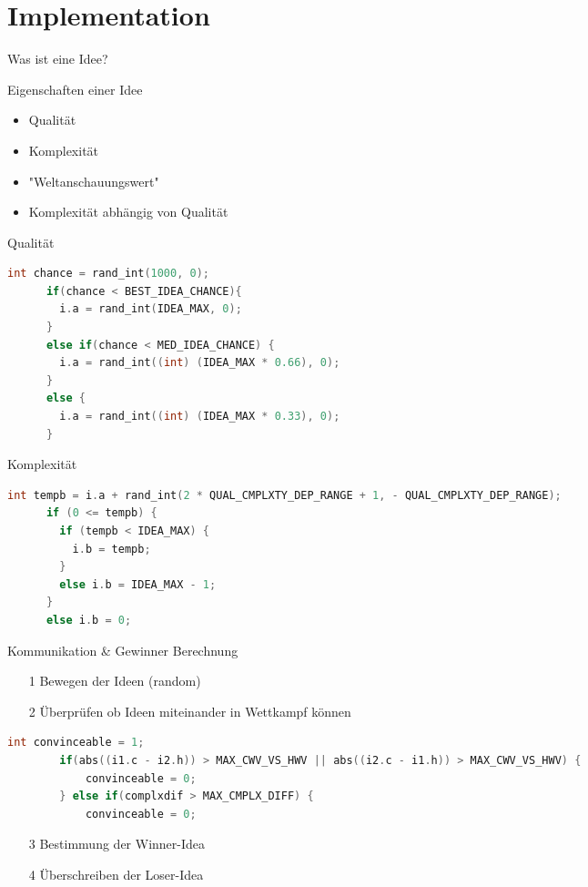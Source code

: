 \section{Implementation}

\begin{frame}{Was ist eine Idee?}
	\begin{block}{Eigenschaften einer Idee}
		\begin{itemize}
			\item Qualität
			\item Komplexität
			\item "Weltanschauungswert"
			\item Komplexität abhängig von Qualität
		\end{itemize}
	\end{block}
\end{frame}

\begin{frame}{Qualität}
	\begin{lstlisting}[language=C,basicstyle=\small,keywordstyle=\color{black}]
	 int chance = rand_int(1000, 0);
	  if(chance < BEST_IDEA_CHANCE){
	    i.a = rand_int(IDEA_MAX, 0);
	  }
	  else if(chance < MED_IDEA_CHANCE) {
	    i.a = rand_int((int) (IDEA_MAX * 0.66), 0);
	  }
	  else {
	    i.a = rand_int((int) (IDEA_MAX * 0.33), 0);
	  }
	  \end{lstlisting}
\end{frame}

\begin{frame}{Komplexität}
	\begin{lstlisting}[language=C,basicstyle=\small,keywordstyle=\color{black}]
	int tempb = i.a + rand_int(2 * QUAL_CMPLXTY_DEP_RANGE + 1, - QUAL_CMPLXTY_DEP_RANGE);
	  if (0 <= tempb) {
	    if (tempb < IDEA_MAX) {
	      i.b = tempb;
	    } 
	    else i.b = IDEA_MAX - 1;
	  } 
	  else i.b = 0;
	\end{lstlisting}
\end{frame}

\begin{frame} {Kommunikation \& Gewinner Berechnung}
	\begin{itemize}
	\item[1] Bewegen der Ideen (random)
	\item[2] Überprüfen ob Ideen miteinander in Wettkampf können 
	\end{itemize}
		\begin{lstlisting}[language=C,basicstyle=\small,keywordstyle=\color{black}]
		int convinceable = 1;
		if(abs((i1.c - i2.h)) > MAX_CWV_VS_HWV || abs((i2.c - i1.h)) > MAX_CWV_VS_HWV) {
	    	convinceable = 0;
	  	} else if(complxdif > MAX_CMPLX_DIFF) {
	    	convinceable = 0;
		\end{lstlisting}	
	\begin{itemize}
	\item[3] Bestimmung der Winner-Idea 
	\item[4] Überschreiben der Loser-Idea
	\end{itemize}
\end{frame}


